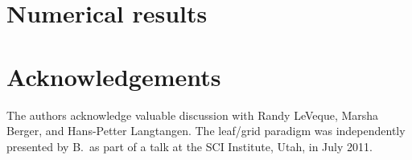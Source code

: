\documentclass{IOS-Book-Article}     %
\begin{document}
\section*{Numerical results}



\section*{Acknowledgements}

The authors acknowledge valuable discussion with Randy LeVeque, Marsha Berger,
and Hans-Petter Langtangen.  The leaf/grid paradigm was independently presented
by B.\ as part of a talk at the SCI Institute, Utah, in July 2011.




\end{document}
